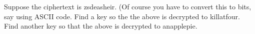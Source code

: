   Suppose the ciphertext is zsdeasheir. (Of course you have to convert this to bits, say using ASCII code.
  Find a key so the the above is decrypted to killatfour.
  Find another key so that the above is decrypted to anapplepie.
